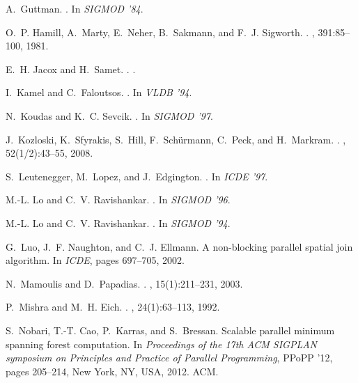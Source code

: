 \documentclass{vldb}
\begin{document}
\begin{thebibliography}{10}
A.~Guttman.
.
\newblock In {\em SIGMOD '84}.

O.~P. Hamill, A.~Marty, E.~Neher, B.~Sakmann, and F.~J. Sigworth.
.
, 391:85--100,
  1981.

E.~H. Jacox and H.~Samet.
.
.

I.~Kamel and C.~Faloutsos.
.
\newblock In {\em VLDB '94}.

N.~Koudas and K.~C. Sevcik.
.
\newblock In {\em SIGMOD '97}.

J.~Kozloski, K.~Sfyrakis, S.~Hill, F.~Sch\"urmann, C.~Peck, and H.~Markram.
.
,
  52(1/2):43--55, 2008.

S.~Leutenegger, M.~Lopez, and J.~Edgington.
.
\newblock In {\em ICDE '97}.

M.-L. Lo and C.~V. Ravishankar.
.
\newblock In {\em SIGMOD '96}.

M.-L. Lo and C.~V. Ravishankar.
.
\newblock In {\em SIGMOD '94}.

G.~Luo, J.~F. Naughton, and C.~J. Ellmann.
\newblock A non-blocking parallel spatial join algorithm.
\newblock In {\em ICDE}, pages 697--705, 2002.

N.~Mamoulis and D.~Papadias.
.
, 15(1):211--231, 2003.

P.~Mishra and M.~H. Eich.
.
, 24(1):63--113, 1992.

S.~Nobari, T.-T. Cao, P.~Karras, and S.~Bressan.
\newblock Scalable parallel minimum spanning forest computation.
\newblock In {\em Proceedings of the 17th ACM SIGPLAN symposium on Principles
  and Practice of Parallel Programming}, PPoPP '12, pages 205--214, New York,
  NY, USA, 2012. ACM.


\end{thebibliography}
\end{document}
